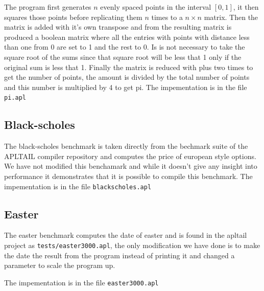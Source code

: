 \documentclass[11pt]{article}
\begin{document}
The program first generates $n$ evenly spaced points in the interval $[0,1]$, it then squares those points before replicating them $n$ times to a $n \times n$ matrix.
Then the matrix is added with it's own transpose and from the resulting matrix is produced a boolean matrix
where all the entries with points with distance less than one from 0 are set to 1 and the rest to 0. Is is not necessary to take
the square root of the sums since that square root will be less that 1 only if the original sum is less that 1.
Finally the matrix is reduced with plus two times to get the number of points, the amount is divided by the total number of points and
this number is multiplied by 4 to get pi.
The impementation is in the file {\tt pi.apl}

\subsection{Black-scholes}
The black-scholes benchmark is taken directly from the bechmark suite of the APLTAIL compiler repository and computes the price of european style options. We have not modified this benchamark and while it doesn't give any insight into performance it demonstrates
that it is possible to compile this benchmark. 
The impementation is in the file {\tt blackscholes.apl}

\subsection{Easter}
The easter benchmark computes the date of easter and is found in the apltail project as {\tt tests/easter3000.apl}, the only
modification we have done is to make the date the result from the program instead of printing it and changed a parameter to scale
the program up.

The impementation is in the file {\tt easter3000.apl}
\end{document}
